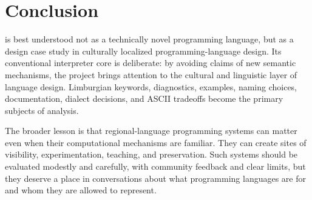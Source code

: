 \section{Conclusion}

\plat{} is best understood not as a technically novel programming language,
but as a design case study in culturally localized programming-language
design. Its conventional interpreter core is deliberate: by avoiding claims of
new semantic mechanisms, the project brings attention to the cultural and
linguistic layer of language design. Limburgian keywords, diagnostics,
examples, naming choices, documentation, dialect decisions, and ASCII tradeoffs
become the primary subjects of analysis.

The broader lesson is that regional-language programming systems can matter
even when their computational mechanisms are familiar. They can create sites
of visibility, experimentation, teaching, and preservation. Such systems
should be evaluated modestly and carefully, with community feedback and clear
limits, but they deserve a place in conversations about what programming
languages are for and whom they are allowed to represent.
